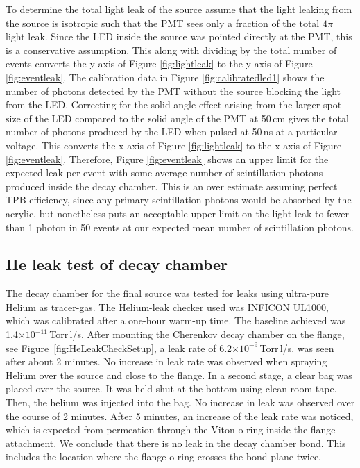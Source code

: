 To determine the total light leak of the source assume that the light leaking from the source is isotropic such that the PMT sees only a fraction of the total $4\pi$ light leak. Since the LED inside the source was pointed directly at the PMT, this is a conservative assumption. This along with dividing by the total number of events converts the y-axis of Figure \ref{fig:lightleak} to the y-axis of Figure \ref{fig:eventleak}. The calibration data in Figure \ref{fig:calibratedled1} shows the number of photons detected by the PMT without the source blocking the light from the LED. Correcting for the solid angle effect arising from the larger spot size of the LED compared to the solid angle of the PMT at 50\,cm gives the total number of photons produced by the LED when pulsed at 50\,ns at a particular voltage. This converts the x-axis of Figure \ref{fig:lightleak} to the x-axis of Figure \ref{fig:eventleak}. Therefore, Figure \ref{fig:eventleak} shows an upper limit for the expected leak per event with some average number of scintillation photons produced inside the decay chamber. This is an over estimate assuming perfect TPB efficiency, since any primary scintillation photons would be absorbed by the acrylic, but nonetheless puts an acceptable upper limit on the light leak to fewer than 1 photon in 50 events at our expected mean number of scintillation photons.

\subsection{He leak test of decay chamber}
\label{sec:heleak}
The decay chamber for the final source was tested for leaks using ultra-pure Helium as tracer-gas. The Helium-leak checker used was INFICON UL1000, which was calibrated after a one-hour warm-up time. The baseline achieved was 1.4$\times10^{-11}$\,Torr\,l/s. After mounting the Cherenkov decay chamber on the flange, see Figure~\ref{fig:HeLeakCheckSetup}, a leak rate of 6.2$\times10^{-9}$\,Torr\,l/s. was seen after about 2 minutes. No increase in leak rate was observed when spraying Helium over the source and close to the flange. In a second stage, a clear bag was placed over the source. It was held shut at the bottom using clean-room tape. Then, the helium was injected into the bag. No increase in leak was observed over the course of 2 minutes. After 5 minutes, an increase of the leak rate was noticed, which is expected from permeation through the Viton o-ring inside the flange-attachment. We conclude that there is no leak in the decay chamber bond. This includes the location where the flange o-ring crosses the bond-plane twice.

